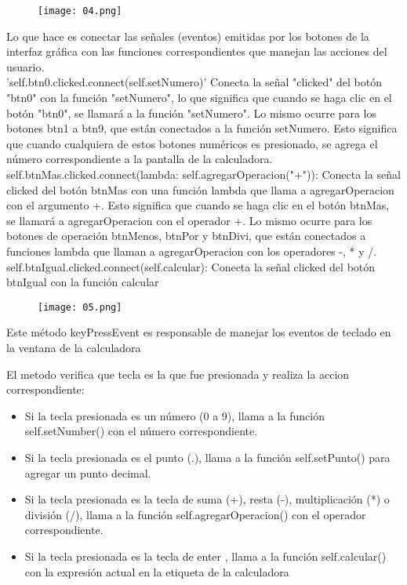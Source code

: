 \documentclass[11pt]{article}
\begin{document}
\begin{figure}[H]
		\begin{center}
 			\texttt{[image: 04.png]}
 			
		\end{center} 
\end{figure}
Lo que hace es conectar las señales (eventos) emitidas por los botones de la interfaz gráfica con las funciones correspondientes que manejan las acciones del usuario.\\
'self.btn0.clicked.connect(self.setNumero)' Conecta la señal "clicked" del botón "btn0" con la función "setNumero", lo que significa que cuando se haga clic en el botón "btn0", se llamará a la función "setNumero". Lo mismo ocurre para los botones btn1 a btn9, que están conectados a la función setNumero. Esto significa que cuando cualquiera de estos botones numéricos es presionado, se agrega el número correspondiente a la pantalla de la calculadora.\\
self.btnMas.clicked.connect(lambda: self.agregarOperacion("+")): Conecta la señal clicked del botón btnMas con una función lambda que llama a agregarOperacion con el argumento +. Esto significa que cuando se haga clic en el botón btnMas, se llamará a agregarOperacion con el operador +. Lo mismo ocurre para los botones de operación btnMenos, btnPor y btnDivi, que están conectados a funciones lambda que llaman a agregarOperacion con los operadores -, * y /.
self.btnIgual.clicked.connect(self.calcular): Conecta la señal clicked del botón btnIgual con la función calcular

\begin{figure}[H]
		\begin{center}
 			\texttt{[image: 05.png]}
 			
		\end{center} 
\end{figure}

Este método keyPressEvent es responsable de manejar los eventos de teclado en la ventana de la calculadora

El metodo verifica que tecla es la que fue presionada y realiza la accion correspondiente:\\
\begin{itemize}
\item Si la tecla presionada es un número (0 a 9), llama a la función self.setNumber() con el número correspondiente.
\item Si la tecla presionada es el punto (.), llama a la función self.setPunto() para agregar un punto decimal.
\item Si la tecla presionada es la tecla de suma (+), resta (-), multiplicación (*) o división (/), llama a la función self.agregarOperacion() con el operador correspondiente.
\item Si la tecla presionada es la tecla de enter , llama a la función self.calcular() con la expresión actual en la etiqueta de la calculadora 
\end{itemize}
\end{document}
